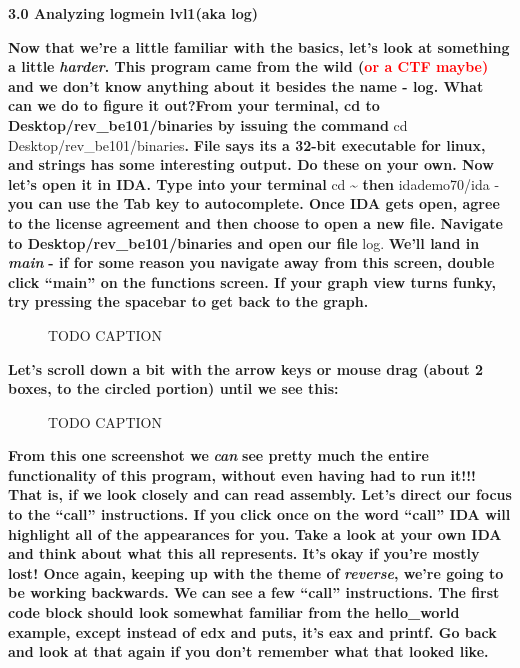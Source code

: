 \documentclass[letterpaper]{article}
\newcommand{\sitfig}[3]{
\begin{figure}[H]
\centering
\makebox[\textwidth][c]{
#2
}
\caption{#3}
\label{#1}
\end{figure}
}
\newcommand{\sitgfx}[4][scale=1.0]{
\sitfig{#3}{\texttt{[image: \#2]}}{#4}
}
\begin{document}
\textbf{3.0 Analyzing logmein lvl1(aka log) }

\textbf{Now that we're a little familiar with the basics, let's look at something a little
}\textbf{\textit{harder}}\textbf{. This program came from the wild (}\textbf{\textcolor{red}{or a CTF maybe)}}\textbf{
and we don't know anything about it besides the name - log. What can we do to figure it out?From your terminal, cd to
Desktop/rev\_be101/binaries by issuing the command }cd Desktop/rev\_be101/binaries\textbf{.
}\textbf{\textcolor[rgb]{0.21960784,0.4627451,0.11372549}{File }}\textbf{says its a 32-bit executable for linux, and
}\textbf{\textcolor[rgb]{0.21960784,0.4627451,0.11372549}{strings }}\textbf{has some interesting output. Do these on
your own. \newline
\newline
Now let's open it in IDA. Type into your terminal }cd \~{} \textbf{then }idademo70/ida -\textbf{you can use the Tab key
to autocomplete. Once IDA gets open, agree to the license agreement and then choose to open a new file. Navigate to
Desktop/rev\_be101/binaries and open our file }log. \textbf{We'll land in }\textbf{\textit{main }}\textbf{ {}- if for
some reason you navigate away from this screen, double click ``main'' on the functions screen. If your graph view turns
funky, try pressing the spacebar to get back to the graph.}  
\sitgfx[width=6.5in,height=3.2638in]{FINALWORKINGDOCFORMERLYPRECURSOR-img012.png}{fig:unk}{TODO CAPTION}
 

\textbf{Let's scroll down a bit with the arrow keys or mouse drag (about 2 boxes, to the circled portion) until we see
this:  }

  
\sitgfx[width=6.5in,height=3.4862in]{FINALWORKINGDOCFORMERLYPRECURSOR-img013.png}{fig:unk}{TODO CAPTION}
 

\textbf{From this one screenshot we }\textbf{\textit{can}}\textbf{ see pretty much the entire functionality of this
program, without even having had to run it!!! That is, if we look closely and can read assembly. Let's direct our focus
to the ``call'' instructions. If you click once on the word ``call'' IDA will highlight all of the appearances for you.
Take a look at your own IDA and think about what this all represents. It's okay if you're mostly lost! Once again,
keeping up with the theme of }\textbf{\textit{reverse}}\textbf{, we're going to be working backwards. \newline
\newline
We can see a few ``call'' instructions. The first code block should look somewhat familiar from the hello\_world
example, except instead of edx and puts, it's eax and printf. Go back and look at that again if you don't remember what
that looked like.}
\end{document}
